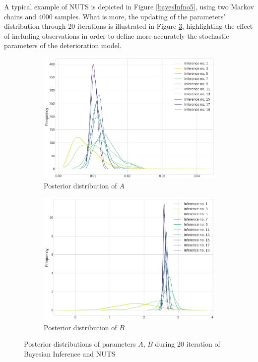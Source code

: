A typical example of \gls{NUTS} is depicted in Figure \ref{bayesInfno5}, using two Markov chains and 4000 samples. What is more, the updating of the parameters' distribution through 20 iterations is illustrated in Figure \ref{posteriorsAfter20Iterations}, highlighting the effect of including observations in order to define more accurately the stochastic parameters of the deterioration model. 

\begin{figure}[H]
    \centering
    \begin{subfigure}[b]{0.48\textwidth}
        \centering
        \includegraphics[width=\textwidth]{Figures/inferenceA.png}
        \caption{Posterior distribution of $A$}
        \label{postA20iters}
    \end{subfigure}
    \hfill
    \begin{subfigure}[b]{0.48\textwidth}
        \centering
        \includegraphics[width=\textwidth]{Figures/inferenceB.png}
        \caption{Posterior distribution of $B$}
        \label{postB20iters}
    \end{subfigure}
    \caption{Posterior distributions of parameters $A$, $B$ during 20 iteration of Bayesian Inference and \gls{NUTS}}
    \label{posteriorsAfter20Iterations}
\end{figure}


